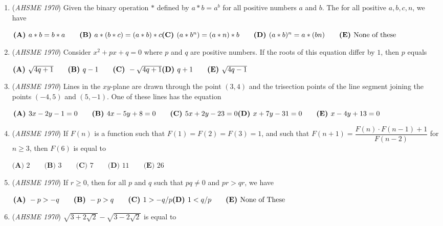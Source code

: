 \begin{enumerate}
 $\textbf{(A) }4r^2\qquad \textbf{(B) }6r^2\qquad \textbf{(C) }8r^2\qquad \textbf{(D) }12r^2\qquad  \textbf{(E) }20r^2$


	\item (\textit{AHSME 1970}) Given the binary operation $\ast$ defined by $a\ast b=a^b$ for all positive numbers $a$ and $b$. The for all positive $a,b,c,n$, we have


 $\textbf{(A) }a\ast b=b\ast a\qquad \textbf{(B) }a\ast (b\ast c)=(a\ast b)\ast c\qquad\\ \textbf{(C) }(a\ast b^n)=(a\ast n)\ast b\qquad \textbf{(D) }(a\ast b)^n=a\ast (bn)\qquad  \textbf{(E) }\text{None of these}$


	\item (\textit{AHSME 1970}) Consider $x^2+px+q=0$ where $p$ and $q$ are positive numbers. If the roots of this equation differ by $1$, then $p$ equals


 $\textbf{(A) }\sqrt{4q+1}\qquad \textbf{(B) }q-1\qquad \textbf{(C) }-\sqrt{4q+1}\qquad\\ \textbf{(D) }q+1\qquad \textbf{(E) }\sqrt{4q-1}$


	\item (\textit{AHSME 1970}) Lines in the $xy$-plane are drawn through the point $(3,4)$ and the trisection points of the line segment 
joining the points $(-4,5)$ and $(5,-1)$. One of these lines has the equation 


 $\textbf{(A) }3x-2y-1=0\qquad \textbf{(B) }4x-5y+8=0\qquad \textbf{(C) }5x+2y-23=0\qquad\\ \textbf{(D) }x+7y-31=0\qquad  \textbf{(E) }x-4y+13=0$


	\item (\textit{AHSME 1970}) If $F(n)$ is a function such that $F(1)=F(2)=F(3)=1$, and such that $F(n+1)=\dfrac{F(n)\cdot F(n-1)+1}{F(n-2)}$ for $n\ge 3$,
then $F(6)$ is equal to


 $\textbf{(A) }2\qquad \textbf{(B) }3\qquad \textbf{(C) }7\qquad \textbf{(D) }11\qquad  \textbf{(E) }26$


	\item (\textit{AHSME 1970}) If $r\ge 0$, then for all $p$ and $q$ such that $pq\neq 0$ and $pr>qr$, we have


 $\textbf{(A) }-p>-q\qquad \textbf{(B) }-p>q\qquad \textbf{(C) }1>-q/p\qquad\\ \textbf{(D) }1<q/p\qquad \textbf{(E) }\text{None of These}$


	\item (\textit{AHSME 1970}) $\sqrt{3+2\sqrt{2}}-\sqrt{3-2\sqrt{2}}$ is equal to



\end{enumerate}
